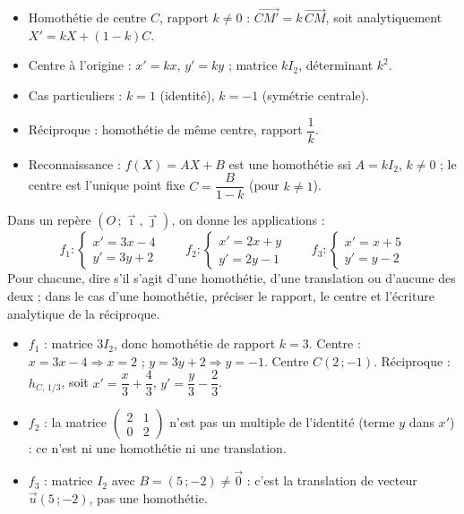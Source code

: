 \documentclass[11pt]{article}
\begin{document}
\begin{aretenir}
\begin{itemize}
\item Homothétie de centre $C$, rapport $k \neq 0$ : $\overrightarrow{CM'} = k\,\overrightarrow{CM}$, soit analytiquement $X' = kX + (1-k)C$.
\item Centre à l'origine : $x' = kx$, $y' = ky$ ; matrice $kI_2$, déterminant $k^2$.
\item Cas particuliers : $k = 1$ (identité), $k = -1$ (symétrie centrale).
\item Réciproque : homothétie de même centre, rapport $\dfrac{1}{k}$.
\item Reconnaissance : $f(X) = AX + B$ est une homothétie ssi $A = kI_2$, $k \neq 0$ ; le centre est l'unique point fixe $C = \dfrac{B}{1-k}$ (pour $k \neq 1$).
\end{itemize}
\end{aretenir}

\begin{exercice}
Dans un repère $(O\,;\vec{\imath},\vec{\jmath})$, on donne les applications :
\[ f_1 : \begin{cases} x' = 3x - 4 \\ y' = 3y + 2 \end{cases} \qquad f_2 : \begin{cases} x' = 2x + y \\ y' = 2y - 1 \end{cases} \qquad f_3 : \begin{cases} x' = x + 5 \\ y' = y - 2 \end{cases} \]
Pour chacune, dire s'il s'agit d'une homothétie, d'une translation ou d'aucune des deux ; dans le cas d'une homothétie, préciser le rapport, le centre et l'écriture analytique de la réciproque.
\end{exercice}

\begin{corrige}
\begin{itemize}
\item $f_1$ : matrice $3I_2$, donc homothétie de rapport $k = 3$. Centre : $x = 3x - 4 \Rightarrow x = 2$ ; $y = 3y + 2 \Rightarrow y = -1$. Centre $C(2\,;-1)$. Réciproque : $h_{C,\,1/3}$, soit $x' = \dfrac{x}{3} + \dfrac{4}{3}$, $y' = \dfrac{y}{3} - \dfrac{2}{3}$.
\item $f_2$ : la matrice $\begin{pmatrix} 2 & 1 \\ 0 & 2 \end{pmatrix}$ n'est pas un multiple de l'identité (terme $y$ dans $x'$) : ce n'est ni une homothétie ni une translation.
\item $f_3$ : matrice $I_2$ avec $B = (5\,;-2) \neq \vec{0}$ : c'est la translation de vecteur $\vec{u}(5\,;-2)$, pas une homothétie.
\end{itemize}
\end{corrige}
\end{document}
